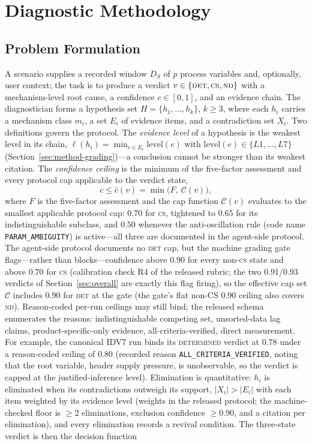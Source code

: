 \documentclass[preprint,10pt]{elsarticle}
\begin{document}
\section{Diagnostic Methodology}
\label{sec:method}

\subsection{Problem Formulation}
A scenario supplies a recorded window $D_S$ of $p$ process variables and, optionally, user context; the task is to produce a verdict $v \in \{\textsc{det},\textsc{cs},\textsc{nd}\}$ with a mechanism-level root cause, a confidence $c \in [0,1]$, and an evidence chain. The diagnostician forms a hypothesis set $H = \{h_1,\dots,h_k\}$, $k \ge 3$, where each $h_i$ carries a mechanism class $m_i$, a set $E_i$ of evidence items, and a contradiction set $X_i$. Two definitions govern the protocol. The \emph{evidence level} of a hypothesis is the weakest level in its chain, $\ell(h_i) = \min_{e \in E_i} \mathrm{level}(e)$ with $\mathrm{level}(e) \in \{L1,\dots,L7\}$ (Section~\ref{sec:method-grading})---a conclusion cannot be stronger than its weakest citation. The \emph{confidence ceiling} is the minimum of the five-factor assessment and every protocol cap applicable to the verdict state,
\begin{equation}
c \le \bar{c}(v) = \min\bigl(F,\ \mathcal{C}(v)\bigr),
\label{eq:ceiling}
\end{equation}
where $F$ is the five-factor assessment and the cap function $\mathcal{C}(v)$ evaluates to the smallest applicable protocol cap: $0.70$ for \textsc{cs}, tightened to $0.65$ for its indistinguishable subclass, and $0.50$ whenever the anti-oscillation rule (code name \texttt{PARAM\_AMBIGUITY}) is active---all three are documented in the agent-side protocol. The agent-side protocol documents no \textsc{det} cap, but the machine grading gate flags---rather than blocks---confidence above $0.90$ for every non-\textsc{cs} state and above $0.70$ for \textsc{cs} (calibration check R4 of the released rubric; the two 0.91/0.93 verdicts of Section~\ref{sec:overall} are exactly this flag firing), so the effective cap set $\mathcal{C}$ includes $0.90$ for \textsc{det} at the gate (the gate's flat non-CS $0.90$ ceiling also covers \textsc{nd}). Reason-coded per-run ceilings may still bind; the released schema enumerates the reasons: indistinguishable competing set, unsorted-data lag claims, product-specific-only evidence, all-criteria-verified, direct measurement. For example, the canonical IDV7 run binds its \mbox{\textsc{determined}} verdict at $0.78$ under a reason-coded ceiling of $0.80$ (recorded reason \texttt{ALL\_CRITERIA\_VERIFIED}, noting that the root variable, header supply pressure, is unobservable, so the verdict is capped at the justified-inference level). Elimination is quantitative: $h_i$ is eliminated when its contradictions outweigh its support, $|X_i| > |E_i|$ with each item weighted by its evidence level (weights in the released protocol; the machine-checked floor is $\ge$2 eliminations, exclusion confidence $\ge 0.90$, and a citation per elimination), and every elimination records a revival condition. The three-state verdict is then the decision function
\end{document}

